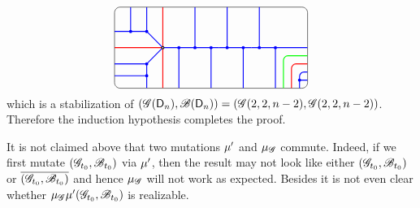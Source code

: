 \[
\begin{tikzpicture}[baseline=-.5ex,scale=0.5]
\draw[rounded corners=5] (-6, -2.5) rectangle (6, 2.5);
\clip[rounded corners=5] (-6, -2.5) rectangle (6, 2.5);
\begin{scope}[xshift=0.5cm]
\draw[thick, red] 
(-3.5, -2.5) -- (-3.5, 2.5)
(-6.5, 0) -- (-3.5, 0)
;
\draw[thick, blue, fill]
(-2.5, -2.5) -- (-2.5,0) circle (2pt)
(-1.5, 2.5) -- (-1.5,0) circle (2pt)
(-0.5, -2.5) -- (-0.5,0) circle (2pt)
;
\draw[thick, blue, fill] 
%
(-3.5, 0) -- (0, 0)
(-3.5, 0) -- (-4.5, 1) circle (2pt) -- (-4.5, 2.5)
(-4.5, 1) -- (-6.5, 1)
(-5.5, 1) circle (2pt) -- (-5.5, 2.5)
%
(-3.5, 0) -- (-4.5, -1) circle (2pt) -- (-4.5, -2.5)
(-4.5, -1) -- (-6.5, -1)
(-4.5, -1.73) circle (2pt) -- (-6.5, -1.73)
;
\draw[thick, fill=white] (-3.5, 0) circle (2pt);
\end{scope}
\draw[blue, thick, fill] (0.5,0) --(1, 0) circle (2pt) -- (1, 3) (1, 0) -- (2, 0) circle (2pt) -- (2, -3) (2,0) -- (2.5,0);
%
\begin{scope}[xshift=3cm]
\draw[blue, thick, fill] (-0.5, 0) -- (0,0) circle (2pt) -- (0,3) (0,0) -- (1,0) circle (2pt) -- (1,-3) (1,0) -- (3,0);
\draw[green, thick, rounded corners] (1.5, -3) -- (1.5, -0.5) -- (3, -0.5);
\draw[red, thick, rounded corners] (2, -3) -- (2, -1) -- (3, -1);
\draw[blue, thick, rounded corners] (2.5, -3) -- (2.5, -1.5) -- (3, -1.5);
\draw[blue, thick, fill] (2.5, -2) circle (2pt) -- (3, -2); 
\end{scope}
\end{tikzpicture}
\]
which is a stabilization of $(\mathscr{G}(\mathsf{D}_n), \mathscr{B}(\mathsf{D}_n))=(\mathscr{G}(2,2,n-2), \mathscr{G}(2,2, n-2))$.
Therefore the induction hypothesis completes the proof.

\begin{remark}
It is not claimed above that two mutations $\mu'$ and $\mu_\mathscr{G}$ commute.
Indeed, if we first mutate $(\mathscr{G}_{t_0},\mathscr{B}_{t_0})$ via $\mu'$, then the result may not look like either $(\mathscr{G}_{t_0},\mathscr{B}_{t_0})$ or $\overline{(\mathscr{G}_{t_0},\mathscr{B}_{t_0})}$ and hence $\mu_\mathscr{G}$ will not work as expected. Besides it is not even clear whether $\mu_\mathscr{G} \mu'(\mathscr{G}_{t_0},\mathscr{B}_{t_0})$ is realizable.
\end{remark}
